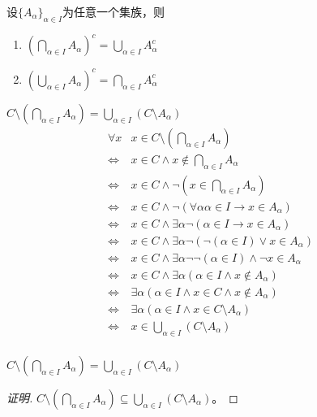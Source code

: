 \documentclass{beamer}
\begin{document}
\begin{CJK*}{UTF8}{gbsn}
\begin{frame}
  \begin{Thm}
    设$\{A_{\alpha}\}_{\alpha \in I}$为任意一个集族，则
    \begin{enumerate}
    \item $(\bigcap_{\alpha \in I}A_{\alpha})^c=\bigcup_{\alpha\in I}A_{\alpha}^c$
    \item $(\bigcup_{\alpha \in I}A_{\alpha})^c=\bigcap_{\alpha\in I}A_{\alpha}^c$
    \end{enumerate}
    \end{Thm}
\end{frame}
\begin{frame}
  $C\setminus(\bigcap_{\alpha \in I}A_{\alpha})=\bigcup_{\alpha\in I}(C\setminus A_{\alpha})$
  \pause
  \begin{equation*}
    \begin{split}
      \forall x&x \in C\setminus (\bigcap_{\alpha \in I}A_{\alpha})\\
      \Leftrightarrow &x \in C \land x \notin \bigcap_{\alpha \in I}A_{\alpha}\\
      \Leftrightarrow &x \in C \land \lnot (x \in \bigcap_{\alpha \in I}A_{\alpha})\\
      \Leftrightarrow &x \in C \land \lnot (\forall \alpha \alpha \in I \to x \in A_{\alpha})\\
      \Leftrightarrow &x \in C \land \exists \alpha \lnot (\alpha \in I \to x \in A_{\alpha})\\
      \Leftrightarrow &x \in C \land \exists \alpha \lnot (\lnot (\alpha \in I) \lor x \in A_{\alpha})\\
      \Leftrightarrow &x \in C \land \exists \alpha \lnot \lnot (\alpha \in I) \land \lnot x\in A_{\alpha}\\
      \Leftrightarrow &x \in C \land \exists \alpha (\alpha \in I \land x\notin A_{\alpha})\\
      \Leftrightarrow &\exists \alpha (\alpha \in I \land x\in C \land x \notin A_{\alpha})\\
      \Leftrightarrow &\exists \alpha (\alpha \in I \land x\in C\setminus A_{\alpha})\\
      \Leftrightarrow &x \in \bigcup_{\alpha \in I} (C\setminus A_{\alpha}) \\
    \end{split}
  \end{equation*}
\end{frame}

\begin{frame}
  $C\setminus(\bigcap_{\alpha \in I}A_{\alpha})=\bigcup_{\alpha\in I}(C\setminus A_{\alpha})$
  \begin{proof}[证明]
    \justifying\let\raggedright\justifying
{}$C\setminus(\bigcap_{\alpha \in I}A_{\alpha})\subseteq \bigcup_{\alpha\in I}(C\setminus A_{\alpha})$。


\end{proof}
\end{frame}
\end{CJK*}
\end{document}
